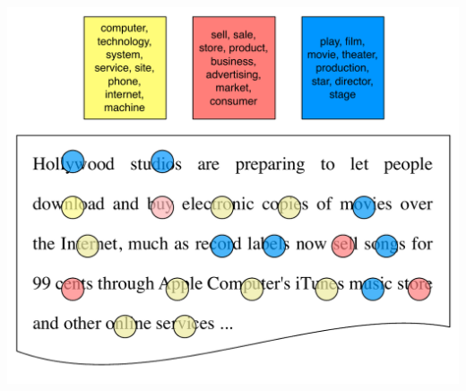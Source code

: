 {\begin{center}
	 {   \includegraphics[width=.8\linewidth]{topic_models/inference_3}  }
	\end{center}

}

